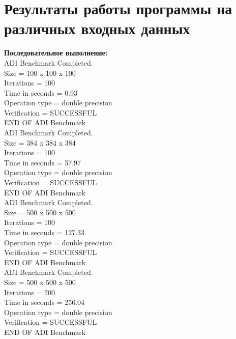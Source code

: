 \documentclass[a4paper,12pt,titlepage,draft]{article}
\begin{document}
\section{Результаты работы программы на различных входных данных}
\begin{minipage}{.5\textwidth}
\textbf{Последовательное выполнение:}\\

 ADI Benchmark Completed.\\
 Size            =  100 x  100 x  100\\
 Iterations      =                100\\
 Time in seconds =               0.93\\
 Operation type  =   double precision\\
 Verification    =         SUCCESSFUL\\
 END OF ADI Benchmark\\
 
 ADI Benchmark Completed.\\
 Size            =  384 x  384 x  384\\
 Iterations      =                100\\
 Time in seconds =              57.97\\
 Operation type  =   double precision\\
 Verification    =         SUCCESSFUL\\
 END OF ADI Benchmark\\

 ADI Benchmark Completed.\\
 Size            =  500 x  500 x  500\\
 Iterations      =                100\\
 Time in seconds =             127.33\\
 Operation type  =   double precision\\
 Verification    =         SUCCESSFUL\\
 END OF ADI Benchmark\\

 ADI Benchmark Completed.\\
 Size            =  500 x  500 x  500\\
 Iterations      =                200\\
 Time in seconds =             256.04\\
 Operation type  =   double precision\\
 Verification    =         SUCCESSFUL\\
 END OF ADI Benchmark\\
 
\end{minipage}
\end{document}
